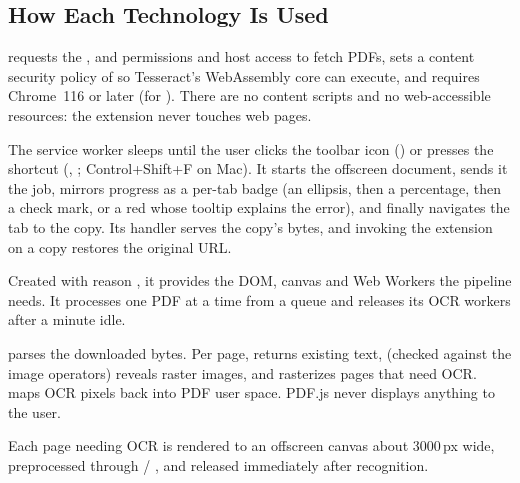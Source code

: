 \subsection{How Each Technology Is Used}
\begin{description}[leftmargin=1.4em, style=nextline]
  \item[Chrome Extension (Manifest V3).]  requests the
        ,  and  permissions and
        host access to fetch PDFs, sets a content security policy of
         so
        Tesseract's WebAssembly core can execute, and requires Chrome~116 or
        later (for ). There are no
        content scripts and no web-accessible resources: the extension never
        touches web pages.
  \item[Service worker, \code{chrome.action} \& \code{chrome.commands}.] The
        service worker sleeps until the user clicks the toolbar icon
        () or presses the shortcut
        (, ; Control+Shift+F on Mac).
        It starts the offscreen document, sends it the job, mirrors progress as a
        per-tab badge (an ellipsis, then a percentage, then a check mark, or a red \code{!} whose
        tooltip explains the error), and finally navigates the tab to the copy.
        Its  handler serves the copy's bytes, and invoking the
        extension on a copy restores the original URL.
  \item[Offscreen document.] Created with reason , it provides the
        DOM, canvas and Web Workers the pipeline needs. It processes one PDF at a
        time from a queue and releases its OCR workers after a minute idle.
  \item[PDF.js.]  parses the downloaded bytes. Per
        page,  returns existing text,
         (checked against the  image
        operators) reveals raster images, and  rasterizes pages
        that need OCR.  maps OCR pixels
        back into PDF user space. PDF.js never displays anything to the user.
  \item[Canvas API.] Each page needing OCR is rendered to an offscreen canvas
        about 3000\,px wide, preprocessed through  /
        , and released immediately after recognition.

\end{description}
